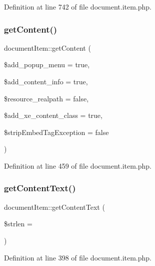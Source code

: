 Definition at line 742 of file document.\+item.\+php.

\mbox{\label{classdocumentItem_ab93870c122bc952a206f3c64ced3aa9e}} 
\subsubsection{\texorpdfstring{get\+Content()}{getContent()}}
{\footnotesize\ttfamily document\+Item\+::get\+Content (\begin{DoxyParamCaption}\item[{}]{\$add\+\_\+popup\+\_\+menu = {\ttfamily true},  }\item[{}]{\$add\+\_\+content\+\_\+info = {\ttfamily true},  }\item[{}]{\$resource\+\_\+realpath = {\ttfamily false},  }\item[{}]{\$add\+\_\+xe\+\_\+content\+\_\+class = {\ttfamily true},  }\item[{}]{\$strip\+Embed\+Tag\+Exception = {\ttfamily false} }\end{DoxyParamCaption})}



Definition at line 459 of file document.\+item.\+php.

\mbox{\label{classdocumentItem_acdef9404e1dc50d82456fb112212e23e}} 
\subsubsection{\texorpdfstring{get\+Content\+Text()}{getContentText()}}
{\footnotesize\ttfamily document\+Item\+::get\+Content\+Text (\begin{DoxyParamCaption}\item[{}]{\$strlen = {} }\end{DoxyParamCaption})}



Definition at line 398 of file document.\+item.\+php.

\mbox{\label{classdocumentItem_adad3fafeaac19dfed4bea9e5709677d4}} 
